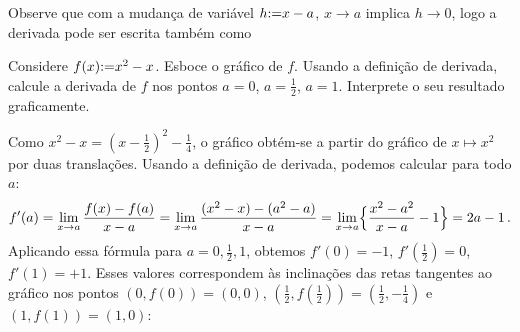 \begin{obs}
Observe que com a mudança de variável $h{:=} x-a$, $x\to a$ implica $h\to
0$, logo a derivada pode ser escrita também como
\end{obs}


\begin{exo}
Considere  $f(x){:=} x^2-x$. Esboce o gráfico de $f$.
Usando a definição de derivada, calcule a derivada de $f$ nos pontos
$a=0$, $a=\frac12$, $a=1$. 
Interprete o seu resultado graficamente.
\begin{sol} 
Como $x^2-x=(x-\frac12)^2-\frac14$, o gráfico obtém-se a partir do gráfico de
$x\mapsto x^2$ por duas translações.
Usando a definição de derivada, podemos calcular para todo $a$:
$$f'(a)=\lim_{x\to a}\frac{f(x)-f(a)}{x-a}
=\lim_{x\to a}\frac{(x^2-x)-(a^2-a)}{x-a}=
\lim_{x\to a}\Bigl\{\frac{x^2-a^2}{x-a}-1\Bigr\}=2a-1\,.$$
Aplicando essa fórmula para $a=0,\frac12,1$, obtemos $f'(0)=-1$,
$f'(\frac12)=0$, $f'(1)=+1$. 
Esses valores correspondem às inclinações das retas
tangentes ao gráfico nos pontos $(0,f(0))=(0,0)$,
$(\frac12,f(\frac12))=(\frac12,-\frac14)$ e $(1,f(1))=(1,0)$:
\begin{center}
\begin{bmlimage}\end{bmlimage}
\end{center}
\end{sol}
\end{exo}





